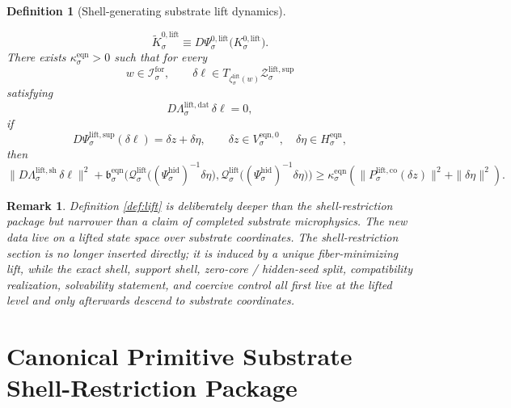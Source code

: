 \documentclass[11pt]{article}
\newcommand{\ForSpace}[1]{\mathcal I_{#1}^{\mathrm{for}}}
\newcommand{\EqnPair}[1]{\mathfrak b_{#1}^{\mathrm{eqn}}}
\newcommand{\EqnZero}[1]{V_{#1}^{\mathrm{eqn},0}}
\newcommand{\EqnHidden}[1]{H_{#1}^{\mathrm{eqn}}}
\newcommand{\HiddenChart}[1]{\Psi_{#1}^{\mathrm{hid}}}
\newcommand{\LiftData}[1]{\Lambda_{#1}^{\mathrm{lift,dat}}}
\newcommand{\LiftShellMap}[1]{\Lambda_{#1}^{\mathrm{lift,sh}}}
\newcommand{\LiftSupportShell}[1]{\mathcal Z_{#1}^{\mathrm{lift,sup}}}
\newcommand{\LiftEqChart}[1]{\Psi_{#1}^{\mathrm{lift,sup}}}
\newcommand{\LiftZeroChart}[1]{\Psi_{#1}^{0,\mathrm{lift}}}
\newcommand{\LiftCharge}[1]{\mathcal Q_{#1}^{\mathrm{lift}}}
\newcommand{\LiftEmbed}[1]{\zeta_{#1}^{\mathrm{lift}}}
\newcommand{\LiftKernel}[1]{K_{#1}^{0,\mathrm{lift}}}
\newcommand{\LiftKernelCh}[1]{\widetilde K_{#1}^{0,\mathrm{lift}}}
\newcommand{\LiftStateComp}[1]{P_{#1}^{\mathrm{lift,co}}}
\newtheorem{definition}{Definition}
\newtheorem{remark}{Remark}
\begin{document}
\begin{definition}[Shell-generating substrate lift dynamics]
\begin{enumerate}
\[    \LiftKernelCh{\sigma}
    \equiv
    D\LiftZeroChart{\sigma}\bigl(\LiftKernel{\sigma}\bigr).
    \]
    There exists \(\kappa_{\sigma}^{\mathrm{eqn}}>0\) such that for every
    \[
    w\in\ForSpace{\sigma},
    \qquad
    \delta \ell\in T_{\LiftEmbed{\sigma}(w)}\LiftSupportShell{\sigma}
    \]
    satisfying
    \[
    D\LiftData{\sigma}\,\delta \ell=0,
    \]
    if
    \[
    D\LiftEqChart{\sigma}(\delta \ell)=\delta z+\delta\eta,
    \qquad
    \delta z\in\EqnZero{\sigma},
    \quad
    \delta\eta\in\EqnHidden{\sigma},
    \]
    then
    \begin{equation}
    \|D\LiftShellMap{\sigma}\,\delta \ell\|^{2}
    +
    \EqnPair{\sigma}\bigl(
    \LiftCharge{\sigma}\bigl((\HiddenChart{\sigma})^{-1}\delta\eta\bigr),
    \LiftCharge{\sigma}\bigl((\HiddenChart{\sigma})^{-1}\delta\eta\bigr)
    \bigr)
    \ge
    \kappa_{\sigma}^{\mathrm{eqn}}
    \left(
    \|\LiftStateComp{\sigma}(\delta z)\|^{2}
    +
    \|\delta\eta\|^{2}
    \right).
    \label{eq:liftcoercive}
    \end{equation}
\end{enumerate}
\end{definition}

\begin{remark}
Definition \ref{def:lift} is deliberately deeper than the shell-restriction package but narrower than a claim of completed substrate microphysics. The new data live on a lifted state space over substrate coordinates. The shell-restriction section is no longer inserted directly; it is induced by a unique fiber-minimizing lift, while the exact shell, support shell, zero-core / hidden-seed split, compatibility realization, solvability statement, and coercive control all first live at the lifted level and only afterwards descend to substrate coordinates.
\end{remark}

\section{Canonical Primitive Substrate Shell-Restriction Package}
\end{document}
